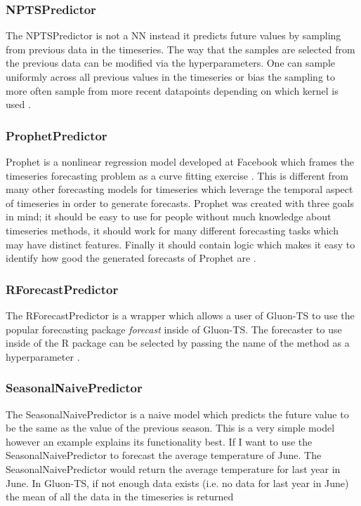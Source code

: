 \subsubsection{NPTSPredictor}
The NPTSPredictor is not a NN instead it predicts future values by sampling from previous data in the timeseries. The way that the samples are selected from the previous data can be modified via the hyperparameters. One can sample uniformly across all previous values in the timeseries or bias the sampling to more often sample from more recent datapoints depending on which kernel is used \cite{gluonts-website}.

\subsubsection{ProphetPredictor}
Prophet is a nonlinear regression model developed at Facebook which frames the timeseries forecasting problem as a curve fitting exercise \cite{hyndman_forecasting_3rd}. This is different from many other forecasting models for timeseries which leverage the temporal aspect of timeseries in order to generate forecasts. Prophet was created with three goals in mind; it should be easy to use for people without much knowledge about timeseries methods, it should work for many different forecasting tasks which may have distinct features. Finally it should contain logic which makes it easy to identify how good the generated forecasts of Prophet are \cite{taylor_forecasting_2017}.

\subsubsection{RForecastPredictor}
The RForecastPredictor is a wrapper which allows a user of Gluon-TS to use the popular forecasting package \textit{forecast} inside of Gluon-TS. The forecaster to use inside of the R package can be selected by passing the name of the method as a hyperparameter \cite{gluonts-website,r-forecast-package}.

\subsubsection{SeasonalNaivePredictor}
The SeasonalNaivePredictor is a naive model which predicts the future value to be the same as the value of the previous season. This is a very simple model however an example explains its functionality best. If I want to use the SeasonalNaivePredictor to forecast the average temperature of June. The SeasonalNaivePredictor would return the average temperature for last year in June. In Gluon-TS, if not enough data exists (i.e. no data for last year in June) the mean of all the data in the timeseries is returned \cite{gluonts-website,hyndman_forecasting_3rd}

